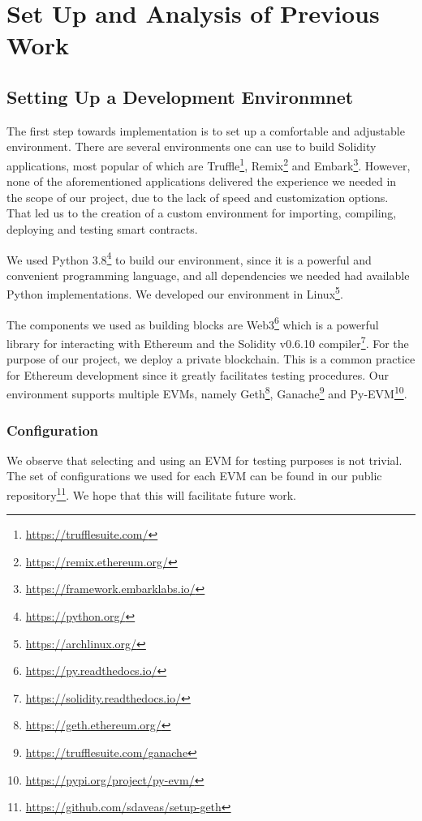 \chapter{Set Up and Analysis of Previous Work}

\section{Setting Up a Development Environmnet}

The first step towards implementation is to set up a comfortable and adjustable
environment. There are several environments one can use to build Solidity
applications, most popular of which are
Truffle\footnote{\url{https://trufflesuite.com/}},
Remix\footnote{\url{https://remix.ethereum.org/}} and
Embark\footnote{\url{https://framework.embarklabs.io/}}. However, none of the
aforementioned applications delivered the experience we needed in the scope of
our project, due to the lack of speed and customization options. That led us
to the creation of a custom environment for importing, compiling, deploying
and testing smart contracts.

We used Python 3.8\footnote{\url{https://python.org/}} to build our environment,
since it is a powerful and convenient programming language, and all
dependencies we needed had available Python implementations. We developed our
environment in Linux\footnote{\url{https://archlinux.org/}}.

The components we used as building blocks are
Web3\footnote{\url{https://py.readthedocs.io/}}
which is a powerful library for interacting with Ethereum and the Solidity
v0.6.10 compiler\footnote{\url{https://solidity.readthedocs.io/}}.  For
the purpose of our project, we deploy a private blockchain. This is a common
practice for Ethereum development since it greatly facilitates testing
procedures. Our environment supports multiple EVMs, namely
Geth\footnote{\url{https://geth.ethereum.org/}},
Ganache\footnote{\url{https://trufflesuite.com/ganache}} and
Py-EVM\footnote{\url{https://pypi.org/project/py-evm/}}.

\subsection {Configuration}

We observe that selecting and using an EVM for testing purposes is not trivial.
The set of configurations we used for each EVM can be found in our public
repository\footnote{\url{https://github.com/sdaveas/setup-geth}}. We hope that this
will facilitate future work.


